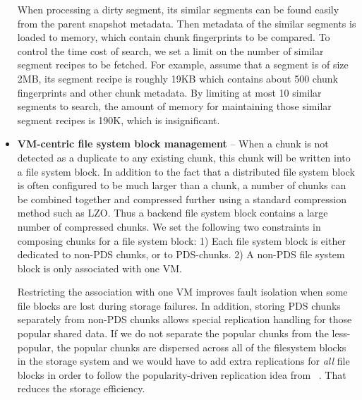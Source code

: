 \begin{itemize}
When processing a dirty segment,
its  similar segments can be found easily from the
parent snapshot metadata.  Then metadata of the similar segments is loaded to memory,
which contain chunk fingerprints to be compared.
To control the time cost of search, we set a limit on the number of  similar segment recipes to be fetched. 
For example, assume that  a segment is of size  2MB, 
its segment recipe is roughly 19KB which contains about 500 chunk fingerprints and other chunk metadata.
By limiting at most 10 similar segments to search, the amount of memory for maintaining those 
similar segment recipes is 190K, which is insignificant. 


\item 
\textbf{VM-centric file system block management} --
When a chunk is not detected as a duplicate to any existing chunk, this chunk will be written
into a file system block.  
In addition to the fact that a distributed file system block is often
configured to be much  larger than a chunk, a number of chunks can be combined together
and compressed further using a standard compression method such as LZO. 
Thus a  backend file system block contains a large number of compressed chunks.
We set the following two constraints in composing chunks for a file system block:
1) Each file system block is either dedicated to non-PDS chunks, or to PDS-chunks.
2) A non-PDS file system block is only associated with one VM.

Restricting the association with one VM improves fault isolation when some file blocks are lost during 
storage failures. 
In addition, storing PDS chunks separately from non-PDS chunks
allows special replication handling for those popular shared data. 
If we do not separate the
popular chunks from the less-popular, the popular chunks are dispersed across
all of the filesystem blocks in the storage system and we would have
to add extra replications for {\em all} file blocks in order to   follow the popularity-driven replication idea 
from ~\cite{Reliability06}. That reduces the storage efficiency.


\end{itemize}
